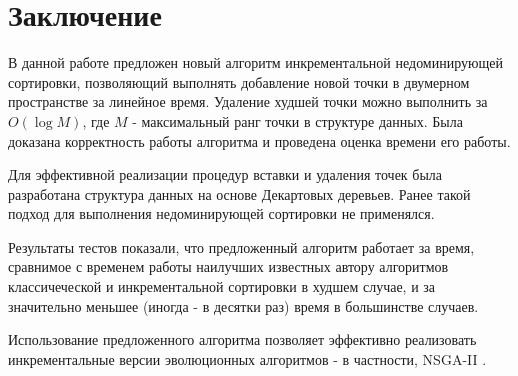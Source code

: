 \chapter{Заключение}
\label{outro}

В данной работе предложен новый алгоритм инкрементальной недоминирующей сортировки, позволяющий 
выполнять добавление новой точки в двумерном пространстве за линейное время. Удаление худшей точки 
можно выполнить за $O(\log M)$, где $M$ - максимальный ранг точки в структуре данных.
Была доказана корректность работы алгоритма и проведена оценка времени его работы.

Для эффективной реализации процедур вставки и удаления точек была разработана структура 
данных на основе Декартовых деревьев. Ранее такой подход для выполнения недоминирующей сортировки 
не применялся.

Результаты тестов показали, что предложенный алгоритм работает за время, сравнимое с временем работы 
наилучших известных автору алгоритмов классичеческой и инкрементальной сортировки в худшем случае, и
за значительно меньшее (иногда - в десятки раз) время в большинстве случаев.

Использование предложенного алгоритма позволяет эффективно реализовать инкрементальные версии
эволюционных алгоритмов - в частности, NSGA-II \cite{max_me_ss_nsga2}.